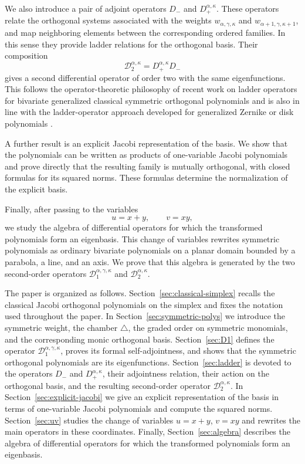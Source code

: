 \documentclass[reqno,10pt]{amsart}
\theoremstyle{plain}
\numberwithin{equation}{section}
\numberwithin{figure}{section}
\begin{document}
We also introduce a pair of adjoint operators \(D_-\) and
\(D_+^{\alpha,\kappa}\). These operators relate the orthogonal systems
associated with the weights \(w_{\alpha,\gamma,\kappa}\) and
\(w_{\alpha+1,\gamma,\kappa+1}\), and map neighboring elements between the
corresponding ordered families. In this sense they provide ladder relations
for the orthogonal basis. Their composition
\[
\mathcal D_2^{\alpha,\kappa}=D_+^{\alpha,\kappa}D_-
\]
gives a second differential operator of order two with the same
eigenfunctions. This follows the operator-theoretic philosophy of recent work
on ladder operators for bivariate generalized classical symmetric orthogonal
polynomials \cite{AMP25} and is also in line with the ladder-operator approach
developed for generalized Zernike or disk polynomials
\cite{Marriaga2025}.

A further result is an explicit Jacobi representation of the basis. We show
that the polynomials can be written as products of one-variable Jacobi
polynomials and prove directly that the resulting family is mutually
orthogonal, with closed formulas for its squared norms. These formulas
determine the normalization of the explicit basis.

Finally, after passing to the variables
\[
u=x+y,\qquad v=xy,
\]
we study the algebra of differential operators for which the transformed
polynomials form an eigenbasis. This change of variables rewrites symmetric
polynomials as ordinary bivariate polynomials on a planar domain bounded by
a parabola, a line, and an axis.
We prove that this
algebra is generated by the two second-order operators
\(\mathcal D_1^{\alpha,\gamma,\kappa}\) and
\(\mathcal D_2^{\alpha,\kappa}\).

The paper is organized as follows. Section~\ref{sec:classical-simplex}
recalls the classical Jacobi orthogonal polynomials on the simplex and fixes
the notation used throughout the paper. In Section~\ref{sec:symmetric-polys}
we introduce the symmetric weight, the chamber $\triangle$, the graded order
on symmetric monomials, and the corresponding monic orthogonal basis.
Section~\ref{sec:D1} defines the operator
$\mathcal D_{1}^{\alpha,\gamma,\kappa}$, proves its formal self-adjointness, and
shows that the symmetric orthogonal polynomials are its eigenfunctions.
Section~\ref{sec:ladder} is devoted to the operators $D_-$ and
$D_+^{\alpha,\kappa}$, their adjointness relation, their action on the
orthogonal basis, and the resulting second-order operator
$\mathcal D_{2}^{\alpha,\kappa}$. In
Section~\ref{sec:explicit-jacobi} we give an explicit representation of the
basis in terms of one-variable Jacobi polynomials and compute the squared
norms. Section~\ref{sec:uv} studies the change of variables
$u=x+y$, $v=xy$ and rewrites the main operators in these coordinates.
Finally, Section~\ref{sec:algebra} describes the algebra of differential
operators for which the transformed polynomials form an eigenbasis.
\end{document}
